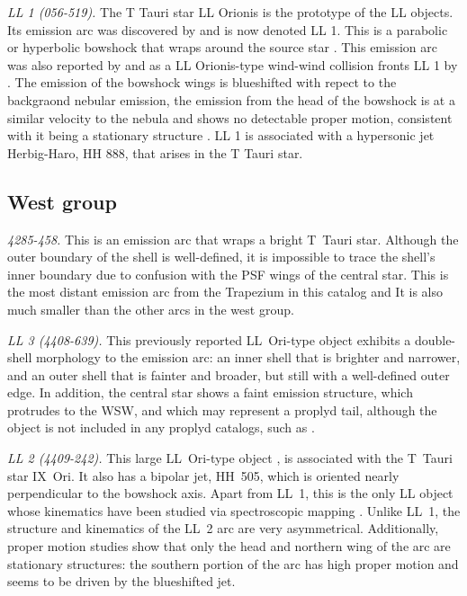 \documentclass[iop, apj]{emulateapj}
\begin{document}
\textit{LL 1 (056-519).} The T Tauri star LL Orionis is the prototype
of the LL objects. Its emission arc was discovered by
\citet{Gull:1979a} and is now denoted LL 1. This is a parabolic or
hyperbolic bowshock that wraps around the source star
\citep{Bally:2006a}. This emission arc was also reported by
\citet{Bally:2000a} and as a LL Orionis-type wind-wind collision
fronts LL 1 by \citet{Bally:2001a}. The emission of the bowshock wings
is blueshifted with repect to the backgraond nebular emission, the
emission from the head of the bowshock is at a similar velocity to the
nebula and shows no detectable proper motion, consistent with it being
a stationary structure \citep{Henney:2013a}. LL 1 is associated with a
hypersonic jet Herbig-Haro, HH 888, that arises in the T Tauri star.


\subsection{West group}
\label{sec:w-group}

\textit{4285-458.} This is an emission arc that wraps a bright T~Tauri
star. Although the outer boundary of the shell is well-defined, it is
impossible to trace the shell's inner boundary due to confusion with
the PSF wings of the central star. This is the most distant emission
arc from the Trapezium in this catalog and It is also much smaller
than the other arcs in the west group.

\textit{LL 3 (4408-639).} This previously reported LL~Ori-type object
\citep{Bally:2001a} exhibits a double-shell morphology to the emission
arc: an inner shell that is brighter and narrower, and an outer shell
that is fainter and broader, but still with a well-defined outer edge.
In addition, the central star shows a faint emission structure, which
protrudes to the WSW, and which may represent a proplyd tail, although
the object is not included in any proplyd catalogs, such as
\citet{Ricci:2008a}.

\textit{LL 2 (4409-242).} This large LL~Ori-type object
\citep{Bally:2001a}, is associated with the T~Tauri star IX~Ori. It
also has a bipolar jet, HH~505, which is oriented nearly perpendicular
to the bowshock axis. Apart from LL~1, this is the only LL object
whose kinematics have been studied via spectroscopic mapping
\citep{Henney:2013a}. Unlike LL~1, the structure and kinematics of the
LL~2 arc are very asymmetrical.  Additionally, proper motion studies
\citep{Henney:2013a} show that only the head and northern wing of the
arc are stationary structures: the southern portion of the arc has
high proper motion and seems to be driven by the blueshifted jet.
\end{document}
